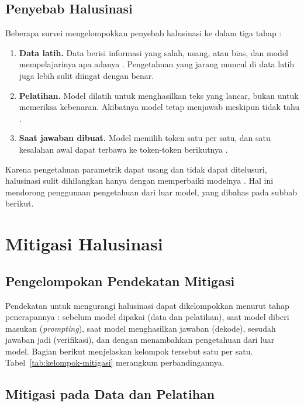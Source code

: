 \subsection{Penyebab Halusinasi}
\label{sec:penyebab-halusinasi}

Beberapa survei mengelompokkan penyebab halusinasi ke dalam tiga tahap \autocite{Huang2025, Patil2024}:
\begin{enumerate}
  \item \textbf{Data latih.} Data berisi informasi yang salah, usang, atau
bias, dan model mempelajarinya apa adanya \autocite{Huang2025, Chang2026}. Pengetahuan yang jarang muncul di data latih juga lebih sulit diingat dengan benar.
  \item \textbf{Pelatihan.} Model dilatih untuk menghasilkan teks yang lancar,
bukan untuk memeriksa kebenaran. Akibatnya model tetap menjawab meskipun tidak tahu \autocite{Huang2025}.
  \item \textbf{Saat jawaban dibuat.} Model memilih token satu per satu, dan satu
kesalahan awal dapat terbawa ke token-token berikutnya \autocite{Huang2025}.
\end{enumerate}
Karena pengetahuan parametrik dapat usang dan tidak dapat ditelusuri, halusinasi sulit dihilangkan hanya dengan memperbaiki modelnya \autocite{YizhengHuang2026}. Hal ini mendorong penggunaan pengetahuan dari luar model, yang dibahas pada subbab berikut.

\section{Mitigasi Halusinasi}
\label{sec:mitigasi}

\subsection{Pengelompokan Pendekatan Mitigasi}

Pendekatan untuk mengurangi halusinasi dapat dikelompokkan menurut tahap penerapannya \autocite{Huang2025}: sebelum model dipakai (data dan pelatihan), saat model diberi masukan (\emph{prompting}), saat model menghasilkan jawaban (dekode), sesudah jawaban jadi (verifikasi), dan dengan menambahkan pengetahuan dari luar model. Bagian berikut menjelaskan kelompok tersebut satu per satu. Tabel~\ref{tab:kelompok-mitigasi} merangkum perbandingannya.

\subsection{Mitigasi pada Data dan Pelatihan}

